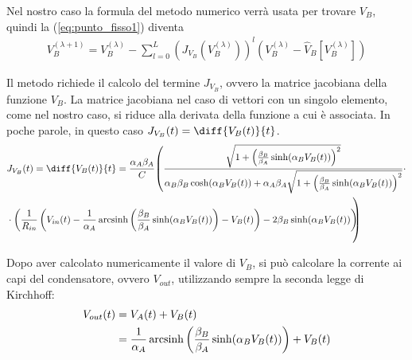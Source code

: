 	Nel nostro caso la formula del metodo numerico verrà usata per trovare $V_{B}$, quindi la (\ref{eq:punto_fisso1}) diventa
	\begin{equation}
		\label{eq:punto_fisso2}
		\begin{split}
			V_{B}^{(\lambda+1)} = V_{B}^{(\lambda)}-\sum_{l=0}^{L} \left(J_{V_{B}}(V_{B}^{(\lambda)})\right)^{l}(V_{B}^{(\lambda)}-\widehat V_{B}[V_{B}^{(\lambda)}])
		\end{split}
	\end{equation}
	
	Il metodo richiede il calcolo del termine $J_{V_{B}}$, ovvero la matrice jacobiana della funzione $V_{B}$. La matrice jacobiana nel caso di vettori con un singolo elemento, come nel nostro caso, si riduce alla derivata della funzione a cui è associata. In poche parole, in questo caso $J_{V_{B}}(t) = \diff{V_{B}(t)}{t}$.
	\begin{equation}
		\label{eq:jacobiana}
		\begin{split}
			&J_{V_{B}}(t) = \diff{V_{B}(t)}{t} = \frac{\alpha_{A}\beta_{A}}{C}\reallybig(\frac{\sqrt{1+\left(\frac{\beta_{B}}{\beta_{A}}\sinh(\alpha_{B}V_{B}(t))\right)^{2}}}{\alpha_{B}\beta_{B}\cosh(\alpha_{B}V_{B}(t))+\alpha_{A}\beta_{A}\sqrt{1+\left(\frac{\beta_{B}}{\beta_{A}}\sinh(\alpha_{B}V_{B}(t))\right)^{2}}}\cdot\\&\cdot\left(\frac{1}{R_{in}}\left(V_{in}(t)-\frac{1}{\alpha_{A}} \arcsinh \left(\frac{\beta_{B}}{\beta_{A}} \sinh(\alpha_{B}V_{B}(t))\right)-V_{B}(t)\right)-2\beta_{B}\sinh(\alpha_{B}V_{B}(t))\right)\hspace{-7px}\reallybig)
		\end{split}
	\end{equation}
	
	Dopo aver calcolato numericamente il valore di $V_{B}$, si può calcolare la corrente ai capi del condensatore, ovvero $V_{out}$, utilizzando sempre la seconda legge di Kirchhoff:
	\begin{equation}
		\label{eq:punto_fisso2}
		\begin{split}
			V_{out}(t) &= V_{A}(t)+V_{B}(t)\\
			&= \frac{1}{\alpha_{A}} \operatorname{arcsinh} \left(\frac{\beta_{B}}{\beta_{A}} \sinh(\alpha_{B}V_{B}(t))\right)+V_{B}(t)
		\end{split}
	\end{equation}
\flushbottom